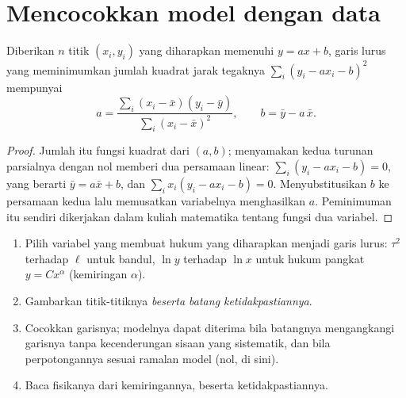 \section{Mencocokkan model dengan data}

\begin{proposition}\label{prop:b1:units-dimensions:regression}
Diberikan $n$ titik $(x_i, y_i)$ yang diharapkan memenuhi $y = a x + b$,
garis lurus yang meminimumkan jumlah kuadrat jarak tegaknya
$\sum_i (y_i - a x_i - b)^2$ mempunyai
\[
a = \frac{\sum_i (x_i - \bar x)(y_i - \bar y)}{\sum_i (x_i - \bar x)^2},
\qquad
b = \bar y - a\,\bar x .
\]
\end{proposition}

\begin{proof}
Jumlah itu fungsi kuadrat dari $(a, b)$; menyamakan kedua turunan
parsialnya dengan nol memberi dua persamaan linear:
$\sum_i (y_i - ax_i - b) = 0$, yang berarti $\bar y = a \bar x + b$, dan
$\sum_i x_i (y_i - ax_i - b) = 0$. Menyubstitusikan $b$ ke persamaan
kedua lalu memusatkan variabelnya menghasilkan $a$. Peminimuman itu
sendiri dikerjakan dalam kuliah matematika tentang fungsi dua variabel.
\end{proof}

\begin{method}\label{met:b1:units-dimensions:fit}
\begin{enumerate}
  \item Pilih variabel yang membuat hukum yang diharapkan menjadi garis
        lurus: $\tau^2$ terhadap $\ell$ untuk bandul, $\ln y$ terhadap
        $\ln x$ untuk hukum pangkat $y = Cx^\alpha$ (kemiringan $\alpha$).
  \item Gambarkan titik-titiknya \emph{beserta batang ketidakpastiannya}.
  \item Cocokkan garisnya; modelnya dapat diterima bila batangnya
        mengangkangi garisnya tanpa kecenderungan sisaan yang
        sistematik, dan bila perpotongannya sesuai ramalan model (nol,
        di sini).
  \item Baca fisikanya dari kemiringannya, beserta ketidakpastiannya.
\end{enumerate}
\end{method}

